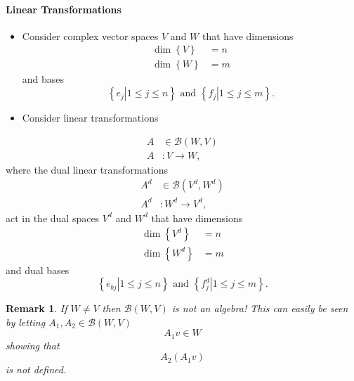 \documentclass[aps,preprint]{revtex4}%
\newtheorem{remark}[theorem]{Remark}
\begin{document}
\paragraph{Linear Transformations}

\begin{itemize}
\item Consider complex vector spaces $V$ and $W$ that have dimensions
\begin{align}
\dim\left\{  V\right\}   &  =n\\
\dim\left\{  W\right\}   &  =m\nonumber
\end{align}
and bases
\begin{equation}
\left\{  \left.  e_{j}\right\vert 1\leq j\leq n\right\}  \text{ and }\left\{
\left.  f_{j}\right\vert 1\leq j\leq m\right\}  .
\end{equation}


\item Consider linear transformations
\end{itemize}

%

\begin{align}
A  &  \in\mathcal{B}\left(  W,V\right) \\
A  &  :V\rightarrow W,\nonumber
\end{align}
where the dual linear transformations%
\begin{align}
A^{d}  &  \in\mathcal{B}\left(  V^{d},W^{d}\right) \\
A^{d}  &  :W^{d}\rightarrow V^{d},
\end{align}
act in the dual spaces $V^{d}$ and $W^{d}$ that have dimensions
\begin{align}
\dim\left\{  V^{d}\right\}   &  =n\\
\dim\left\{  W^{d}\right\}   &  =m\nonumber
\end{align}
and dual bases
\begin{equation}
\left\{  \left.  e_{bj}\right\vert 1\leq j\leq n\right\}  \text{ and }\left\{
\left.  f_{j}^{d}\right\vert 1\leq j\leq m\right\}  .
\end{equation}


\begin{remark}
If $W\neq V$ then $\mathcal{B}\left(  W,V\right)  $ \emph{is not an algebra!
This can easily be seen by letting }$A_{1},A_{2}\in\mathcal{B}\left(
W,V\right)  $
\begin{equation}
A_{1}v\in W
\end{equation}
showing that
\begin{equation}
A_{2}\left(  A_{1}v\right)
\end{equation}
is not defined.
\end{remark}
\end{document}
